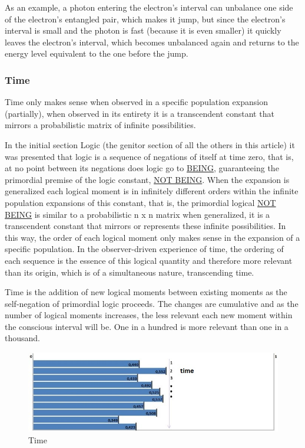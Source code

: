 As an example, a photon entering the electron's interval can unbalance one side of the electron's entangled pair, which makes it jump, but since the electron's interval is small and the photon is fast (because it is even smaller) it quickly leaves the electron's interval, which becomes unbalanced again and returns to the energy level equivalent to the one before the jump.

\subsubsection{Time}
Time only makes sense when observed in a specific population expansion (partially), when observed in its entirety it is a transcendent constant that mirrors a probabilistic matrix of infinite possibilities.

In the initial section Logic (the genitor section of all the others in this article) it was presented that logic is a sequence of negations of itself at time zero, that is, at no point between its negations does logic go to \underline{BEING}, guaranteeing the primordial premise of the logic constant, \underline{NOT BEING}. When the expansion is generalized each logical moment is in infinitely different orders within the infinite population expansions of this constant, that is, the primordial logical \underline{NOT BEING} is similar to a probabilistic n x n matrix when generalized, it is a transcendent constant that mirrors or represents these infinite possibilities. In this way, the order of each logical moment only makes sense in the expansion of a specific population. In the observer-driven experience of time, the ordering of each sequence is the essence of this logical quantity and therefore more relevant than its origin, which is of a simultaneous nature, transcending time.

Time is the addition of new logical moments between existing moments as the self-negation of primordial logic proceeds. The changes are cumulative and as the number of logical moments increases, the less relevant each new moment within the conscious interval will be. One in a hundred is more relevant than one in a thousand. 
	\begin{figure}[H]
	\caption{Time}
	\label{fig:consciousness_time}
	\centering
	\includegraphics[scale=.8]{sections/images/consciousness_time.jpg}
	\end{figure}

